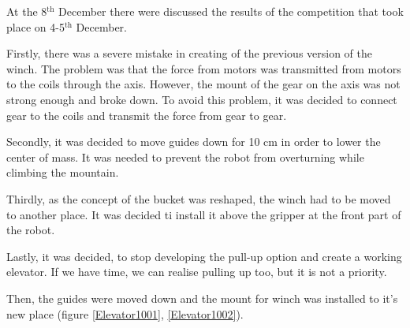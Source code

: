 \begin{enumerate*}
  \item At the 8$^\text{th}$ December there were discussed the results of the competition that took place on 4-5$^\text{th}$ December.
  \begin{enumerate*}
  	
  	\item Firstly, there was a severe mistake in creating of the previous version of the winch. The problem was that the force from motors was transmitted from motors to the coils through the axis. However, the mount of the gear on the axis was not strong enough and broke down. To avoid this problem, it was decided to connect gear to the coils and transmit the force from gear to gear.
  	
  	\item Secondly, it was decided to move guides down for 10 cm in order to lower the center of mass. It was needed to prevent the robot from overturning while climbing the mountain.
  	
  	\item Thirdly, as the concept of the bucket was reshaped, the winch had to be moved to another place. It was decided ti install it above the gripper at the front part of the robot.
  	
  	\item Lastly, it was decided, to stop developing the pull-up option and create a working elevator. If we have time, we can realise pulling up too, but it is not a priority.
  	
  \end{enumerate*}

  \item Then, the guides were moved down and the mount for winch was installed to it's new place (figure \ref{Elevator1001}, \ref{Elevator1002}).
  

\end{enumerate*}
